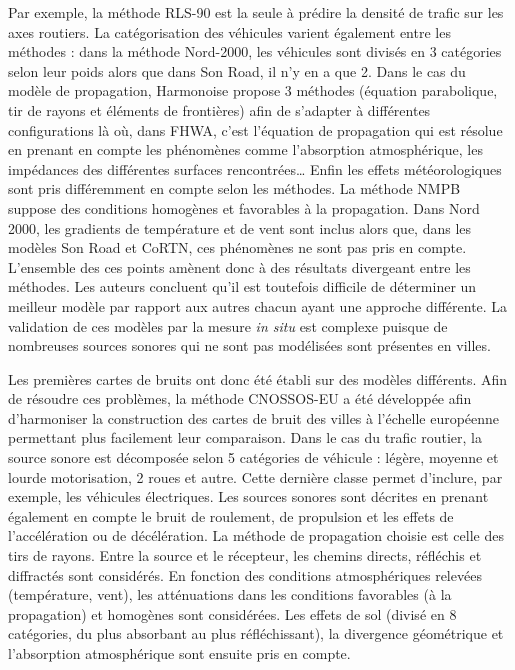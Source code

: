 Par exemple, la méthode RLS-90 est la seule à prédire la densité de trafic sur les axes routiers. La catégorisation des véhicules varient également entre les méthodes : dans la méthode Nord-2000, les véhicules sont divisés en 3 catégories selon leur poids alors que dans Son Road, il n'y en a que 2. Dans le cas du modèle de propagation, Harmonoise propose 3 méthodes (équation parabolique, tir de rayons et éléments de frontières) afin de s'adapter à différentes configurations là où, dans FHWA, c'est l'équation de propagation qui est résolue en prenant en compte les phénomènes comme l'absorption atmosphérique, les impédances des différentes surfaces rencontrées\dots{} Enfin les effets météorologiques sont pris différemment en compte selon les méthodes. La méthode NMPB suppose des conditions homogènes et favorables à la propagation. Dans Nord 2000, les gradients de température et de vent sont inclus alors que, dans les modèles Son Road et CoRTN, ces phénomènes ne sont pas pris en compte. L'ensemble des ces points amènent donc à des résultats divergeant entre les méthodes. 
Les auteurs concluent qu'il est toutefois difficile de déterminer un \og meilleur \fg{} modèle par rapport aux autres chacun ayant une approche différente. La validation de ces modèles par la mesure \textit{in situ} est complexe puisque de nombreuses sources sonores qui ne sont pas modélisées sont présentes en villes. 

Les premières cartes de bruits ont donc été établi sur des modèles différents. 
Afin de résoudre ces problèmes, la méthode CNOSSOS-EU \cite{CNOSSOS,kephalopoulos:hal-00985998} a été développée afin d'harmoniser la construction des cartes de bruit des villes à l'échelle européenne permettant plus facilement leur comparaison. Dans le cas du trafic routier, la source sonore est décomposée selon 5 catégories de véhicule : légère, moyenne et lourde motorisation, 2 roues et autre. Cette dernière classe permet d'inclure, par exemple, les véhicules électriques. Les sources sonores sont décrites en prenant également en compte le bruit de roulement, de propulsion et les effets de l'accélération ou de décélération. 
La méthode de propagation choisie est celle des tirs de rayons. Entre la source et le récepteur, les chemins directs, réfléchis et diffractés sont considérés. En fonction des conditions atmosphériques relevées (température, vent), les atténuations dans les conditions favorables (à la propagation) et homogènes sont considérées. Les effets de sol (divisé en 8 catégories, du plus absorbant au plus réfléchissant), la divergence géométrique et l'absorption atmosphérique sont ensuite pris en compte. 

